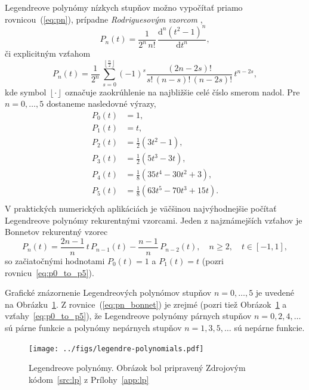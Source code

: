 \documentclass[a4paper, 12pt]{book}
\newcommand{\diff}{\mathrm d}
\begin{document}
Legendreove polynómy nízkych stupňov možno vypočítať priamo 
rovnicou~(\ref{eq:pn}), prípadne \emph{Rodriguesovým vzorcom} 
\citep{SansoGeoidDetermination},
%
\begin{equation}
\label{eq:pn_rodrigues}
P_n(t) = \frac{1}{2^n \, n!} \, \frac{\diff^n (t^2 - 1)^n}{\diff t^n}{,}
\end{equation}
%
či explicitným vzťahom \citep{Freeden2009}
%
\begin{equation}
P_n(t) = \frac{1}{2^n} \, \sum_{s = 0}^{\left\lfloor \frac{n}{2} \right\rfloor} 
(-1)^s \frac{(2n - 2s)!}{s!  \, (n - s)! \, (n - 2s)!} \, t^{n - 2s}{,}
\end{equation}
%
kde symbol $\left\lfloor \cdot \right\rfloor$ označuje zaokrúhlenie na 
najbližšie celé číslo smerom nadol.  Pre $n = 0, \dots, 5$ dostaneme nasledovné 
výrazy,
%
\begin{equation}
\label{eq:p0_to_p5}
\begin{split}
P_0(t) & = 1{,}\\
P_1(t) & = t{,}\\
P_2(t) & = \frac{1}{2} \left( 3t^2  - 1 \right){,}\\
P_3(t) & = \frac{1}{2} (5t^3 - 3t){,}\\
P_4(t) & = \frac{1}{8}(35t^4 - 30t^2 + 3){,}\\
P_5(t) & = \frac{1}{8}(63t^5 - 70t^3 + 15t){.}\\
\end{split}
\end{equation}
%
V praktických numerických aplikáciách je väčšinou najvýhodnejšie počítať 
Legendreove polynómy rekurentnými vzorcami.  Jeden z najznámejších vzťahov je 
Bonnetov rekurentný vzorec
%
\begin{equation}
\label{eq:pn_bonnet}
P_n(t) = \frac{2n - 1}{n} \, t \, P_{n - 1}(t) - \frac{n - 1}{n} \, P_{n 
- 2}(t){,} \quad n \geq 2{,} \quad t \in [-1, 1]{,}
\end{equation}
%
so začiatočnými hodnotami $P_0(t) = 1$ a $P_1(t) = t$ (pozri 
rovnicu~\ref{eq:p0_to_p5}).

Grafické znázornenie Legendreových polynómov stupňov $n =0, \dots, 5$ je 
uvedené na Obrázku~\ref{fig:lp}.  Z rovnice~(\ref{eq:pn_bonnet}) je zrejmé 
(pozri tiež Obrázok~\ref{fig:lp} a vzťahy~\ref{eq:p0_to_p5}), že Legendreove 
polynómy párnych stupňov $n = 0, 2, 4, \dots$ sú párne funkcie a polynómy 
nepárnych stupňov $n = 1, 3, 5, \dots$ sú nepárne funkcie.

\begin{figure}[bt]
\label{fig:lp}
\centering
\texttt{[image: ../figs/legendre-polynomials.pdf]}
\caption{Legendreove polynómy.  Obrázok bol pripravený Zdrojovým 
kódom~\ref{src:lp} z Prílohy~\ref{app:lp}}
\end{figure}
\end{document}
